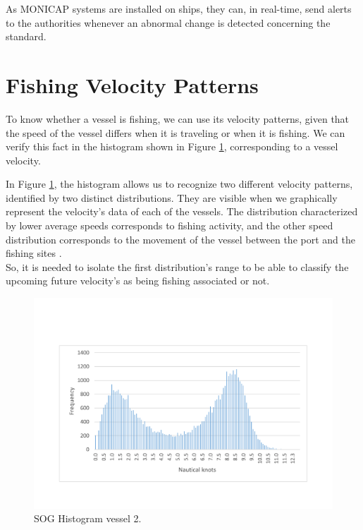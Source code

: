 As MONICAP systems are installed on ships, they can, in real-time, send alerts to the authorities whenever an abnormal change is detected concerning the standard.


\section{Fishing Velocity Patterns} %
\label{sub:fishing_velocity_patterns}

To know whether a vessel is fishing, we can use its velocity patterns, given that the speed of the vessel differs when it is traveling or when it is fishing. We can verify this fact in the histogram shown in Figure \ref{fig:histogram_vessel2}, corresponding to a vessel velocity.

In Figure \ref{fig:histogram_vessel2}, the histogram allows us to recognize two different velocity patterns, identified by two distinct distributions. They are visible when we graphically represent the velocity's data of each of the vessels. The distribution characterized by lower average speeds corresponds to fishing activity, and the other speed distribution corresponds to the movement of the vessel between the port and the fishing sites \cite{MappingFishing}. \\
So, it is needed to isolate the first distribution's range to be able to classify the upcoming future velocity's as being fishing associated or not.
\begin{figure}[H]
\centering
\includegraphics[trim=0 50 0 50, width=0.8\linewidth]{Chapters/img/hist_vessel2.pdf}
\caption{SOG Histogram vessel 2.}
\label{fig:histogram_vessel2}
\end{figure}


